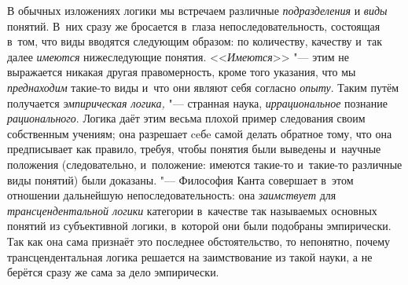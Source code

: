 В обычных изложениях логики мы встречаем различные
{\em подразделения} и {\em виды} понятий. В~них
сразу же бросается в~глаза непоследовательность, состоящая в~том, что виды
вводятся следующим образом: по количеству, качеству и~так далее
{\em имеются} нижеследующие понятия. <<{\em Имеются}>> "--- этим не
выражается никакая другая правомерность, кроме того указания, что мы
{\em преднаходим} такие-то виды и~что они являют себя согласно
{\em опыту}. Таким путём получается {\em эмпирическая логика,} "---
странная наука, {\em иррациональное} познание {\em рационального}.
Логика даёт этим весьма плохой пример следования своим
собственным учениям; она разрешает ceбe самой делать обратное тому, что она
предписывает как правило, требуя, чтобы понятия были выведены и~научные
положения (следовательно, и~положение: имеются такие-то и~такие-то
различные виды понятий) были доказаны. "--- Философия Канта
совершает в~этом отношении дальнейшую непоследовательность: она
{\em заимствует} для {\em трансцендентальной логики}
категории в~качестве так называемых основных
понятий из субъективной логики, в~которой они были подобраны эмпирически.
Так как она сама признаёт это последнее обстоятельство, то непонятно,
почему трансцендентальная логика решается на заимствование из такой науки,
а не берётся сразу же сама за дело эмпирически.

